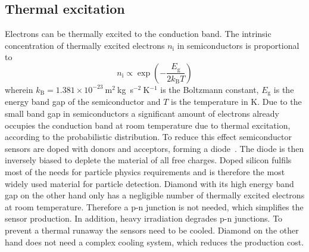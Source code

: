 



\subsection{Thermal excitation}
Electrons can be thermally excited to the conduction band. The intrinsic concentration of thermally excited electrons $n_\mathrm{i}$ in semiconductors is proportional to~\cite{PHSEM:00000}
\begin{equation}
\label{eq:intrinsiccarrier}
n_\mathrm{i} \propto \exp\left(-\frac{E_\mathrm{g}}{2k_\mathrm{B}T}\right)
\end{equation} 
wherein $k_\mathrm{B} = 1.381\times10^{-23}~$m$^2~$kg~s$^{-2}~$K$^{-1}$ is the Boltzmann constant, $E_\mathrm{g}$ is the energy band gap of the semiconductor and $T$ is the temperature in K.
Due to the small band gap in semiconductors a significant amount of electrons already occupies the conduction band at room temperature due to thermal excitation, according to the probabilistic distribution. To reduce this effect semiconductor sensors are doped with donors and acceptors, forming a diode~\cite{PHSEM:00000}. The diode is then inversely biased to deplete the material of all free charges. Doped silicon fulfils most of the needs for particle physics requirements and is therefore the most widely used material for particle detection. Diamond with its high energy band gap on the other hand only has a negligible number of thermally excited electrons at room temperature. Therefore a p-n junction is not needed, which simplifies the sensor production. In addition, heavy irradiation degrades p-n junctions. To prevent a thermal runaway the sensors need to be cooled. Diamond on the other hand does not need a complex cooling system, which reduces the production cost.

